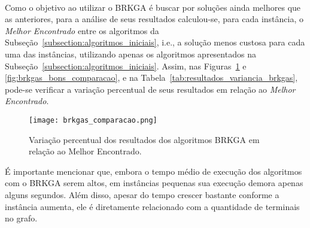 \documentclass[12pt, a4paper]{article}
\begin{document}
\paragraph{}
Como o objetivo ao utilizar o BRKGA é buscar por soluções ainda melhores que as anteriores, para a análise de seus resultados calculou-se, para cada instância, o \emph{Melhor Encontrado} entre os algoritmos da Subseção~\ref{subsection:algoritmos_iniciais}, i.e., a solução menos custosa para cada uma das instâncias, utilizando apenas os algoritmos apresentados na Subseção~\ref{subsection:algoritmos_iniciais}. Assim, nas Figuras~\ref{fig:brkgas_comparacao} e \ref{fig:brkgas_bons_comparacao}, e na Tabela~\ref{tab:resultados_variancia_brkgas}, pode-se verificar a variação percentual de seus resultados em relação ao \emph{Melhor Encontrado}.

\begin{table}[htb]
\centering %
\caption{Resultados da variação percentual dos algoritmos BRKGA em relação ao Melhor Encontrado, e a respectiva média do tempo de execução por instância.}
\label{tab:resultados_variancia_brkgas}
\end{table}

\begin{figure}[H]
\centering
\texttt{[image: brkgas\_comparacao.png]}
\caption{Variação percentual dos resultados dos algoritmos BRKGA em relação ao Melhor Encontrado.}
\label{fig:brkgas_comparacao}
\end{figure}

É importante mencionar que, embora o tempo médio de execução dos algoritmos com o BRKGA serem altos, em instâncias pequenas sua execução demora apenas alguns segundos. Além disso, apesar do tempo crescer bastante conforme a instância aumenta, ele é diretamente relacionado com a quantidade de terminais no grafo.
\end{document}
